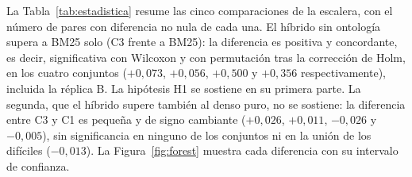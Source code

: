\documentclass[11pt,letterpaper]{article}
\numberwithin{equation}{section}
\begin{document}
La Tabla~\ref{tab:estadistica} resume las cinco comparaciones de la escalera, con el número de pares con diferencia no nula de cada una. El híbrido sin ontología supera a BM25 solo (C3 frente a BM25): la diferencia es positiva y concordante, es decir, significativa con Wilcoxon y con permutación tras la corrección de Holm, en los cuatro conjuntos ($+0{,}073$, $+0{,}056$, $+0{,}500$ y $+0{,}356$ respectivamente), incluida la réplica B. La hipótesis H1 se sostiene en su primera parte. La segunda, que el híbrido supere también al denso puro, no se sostiene: la diferencia entre C3 y C1 es pequeña y de signo cambiante ($+0{,}026$, $+0{,}011$, $-0{,}026$ y $-0{,}005$), sin significancia en ninguno de los conjuntos ni en la unión de los difíciles ($-0{,}013$). La Figura~\ref{fig:forest} muestra cada diferencia con su intervalo de confianza.
\end{document}
